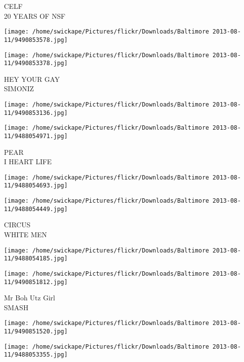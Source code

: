 \documentclass[10pt,letterpaper]{article}
\begin{document}
CELF\\
20 YEARS OF NSF\\
\pagebreak

\texttt{[image: /home/swickape/Pictures/flickr/Downloads/Baltimore 2013-08-11/9490853578.jpg]}

\vspace{0.25in}
\texttt{[image: /home/swickape/Pictures/flickr/Downloads/Baltimore 2013-08-11/9490853378.jpg]}

HEY YOUR GAY\\
SIMONIZ\\
\pagebreak

\texttt{[image: /home/swickape/Pictures/flickr/Downloads/Baltimore 2013-08-11/9490853136.jpg]}

\vspace{0.25in}
\texttt{[image: /home/swickape/Pictures/flickr/Downloads/Baltimore 2013-08-11/9488054971.jpg]}

PEAR\\
I HEART LIFE\\
\pagebreak

\texttt{[image: /home/swickape/Pictures/flickr/Downloads/Baltimore 2013-08-11/9488054693.jpg]}

\vspace{0.25in}
\texttt{[image: /home/swickape/Pictures/flickr/Downloads/Baltimore 2013-08-11/9488054449.jpg]}

CIRCUS\\
WHITE MEN\\
\pagebreak

\texttt{[image: /home/swickape/Pictures/flickr/Downloads/Baltimore 2013-08-11/9488054185.jpg]}

\vspace{0.25in}
\texttt{[image: /home/swickape/Pictures/flickr/Downloads/Baltimore 2013-08-11/9490851812.jpg]}

Mr Boh Utz Girl\\
SMASH\\
\pagebreak

\texttt{[image: /home/swickape/Pictures/flickr/Downloads/Baltimore 2013-08-11/9490851520.jpg]}

\vspace{0.25in}
\texttt{[image: /home/swickape/Pictures/flickr/Downloads/Baltimore 2013-08-11/9488053355.jpg]}
\end{document}
